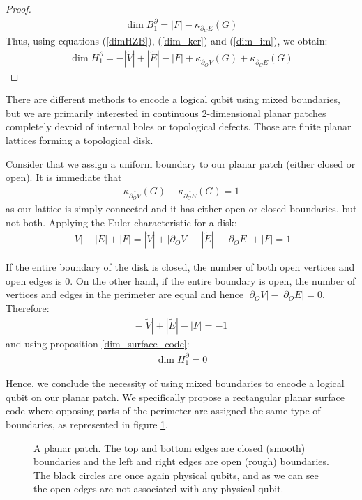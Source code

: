 \documentclass[12pt, twoside, openany]{book}
\begin{document}
\begin{proof}
    \begin{align} \label{dim_im}
        \dim B_1^\partial = |F| - \kappa_{\partial_C E}(G)
    \end{align}
    Thus, using equations (\ref{dimHZB}), (\ref{dim_ker}) and (\ref{dim_im}), we obtain:
    \begin{align*}
    \dim H_1^\partial =-|\tilde{V}| + |\tilde{E}| - |F| + \kappa_{\overline{\partial_O V}}(G) + \kappa_{\overline{\partial_C E}}(G)
    \end{align*}
\end{proof}

There are different methods to encode a logical qubit using mixed boundaries, but we are primarily interested in continuous 2-dimensional planar patches completely devoid of internal holes or topological defects. Those are finite planar lattices forming a topological disk. 

Consider that we assign a uniform boundary to our planar patch (either closed or open). It is immediate that
\begin{align*}
    \kappa_{\overline{\partial_O V}}(G) + \kappa_{\overline{\partial_C E}}(G) = 1
\end{align*}
as our lattice is simply connected and it has either open or closed boundaries, but not both. Applying the Euler characteristic for a disk:
\begin{align*}
    |V|-|E|+|F| = |\tilde{V}| + |\partial_O V| - |\tilde{E}| - |\partial_O E|+|F| = 1
\end{align*}

If the entire boundary of the disk is closed, the number of both open vertices and open edges is 0. On the other hand, if the entire boundary is open, the number of vertices and edges in the perimeter are equal and hence $|\partial_O V| - |\partial_O E| = 0$. Therefore:
\begin{align*}
    -|\tilde{V}| + |\tilde{E}| - |F| = -1
\end{align*}
and using proposition \ref{dim_surface_code}:
\begin{align*}
    \dim H_1^\partial = 0
\end{align*}

Hence, we conclude the necessity of using mixed boundaries to encode a logical qubit on our planar patch. We specifically propose a rectangular planar surface code where opposing parts of the perimeter are assigned the same type of boundaries, as represented in figure \ref{fig:planarpatch}.

\begin{figure}
    \centering
    
    \caption{A planar patch. The top and bottom edges are closed (smooth) boundaries and the left and right edges are open (rough) boundaries. The black circles are once again physical qubits, and as we can see the open edges are not associated with any physical qubit.}
    \label{fig:planarpatch}
\end{figure}
\end{document}
